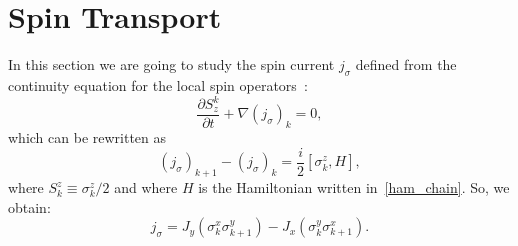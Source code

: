 \section{Spin Transport}
In this section we are going to study the spin current $j_\sigma$ defined from the continuity equation for the local spin operators~\cite{BenentiCasatiProsenRossini}:
\begin{equation}
    \frac{\partial S^k_z}{\partial t} + \nabla (j_\sigma)_k = 0,
\end{equation}
which can be rewritten as
\begin{equation}
    (j_\sigma)_{k+1}-(j_\sigma)_k = \frac{i}{2}[\sigma_k^z , H],
\end{equation}
where $S_k^z \equiv \sigma_k^z/2$ and where $H$ is the Hamiltonian written in~\ref{ham_chain}. So, we obtain:
\begin{equation}
    j_\sigma = J_y (\sigma_k^x \sigma_{k+1}^y) - J_x (\sigma_k^y \sigma_{k+1}^x). 
\end{equation}





